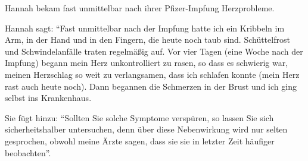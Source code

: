 Hannah bekam fast unmittelbar nach ihrer Pfizer-Impfung Herzprobleme.

Hannah sagt: ``Fast unmittelbar nach der Impfung hatte ich ein Kribbeln im Arm,
in der Hand und in den Fingern, die heute noch taub sind. Schüttelfrost und
Schwindelanfälle traten regelmäßig auf. Vor vier Tagen (eine Woche nach der
Impfung) begann mein Herz unkontrolliert zu rasen, so dass es schwierig war,
meinen Herzschlag so weit zu verlangsamen, dass ich schlafen konnte (mein Herz
rast auch heute noch). Dann begannen die Schmerzen in der Brust und ich ging
selbst ins Krankenhaus.

Sie fügt hinzu: ``Sollten Sie solche Symptome verspüren, so lassen Sie sich
sicherheitshalber untersuchen, denn über diese Nebenwirkung wird nur selten
gesprochen, obwohl meine Ärzte sagen, dass sie sie in letzter Zeit häufiger
beobachten''.

